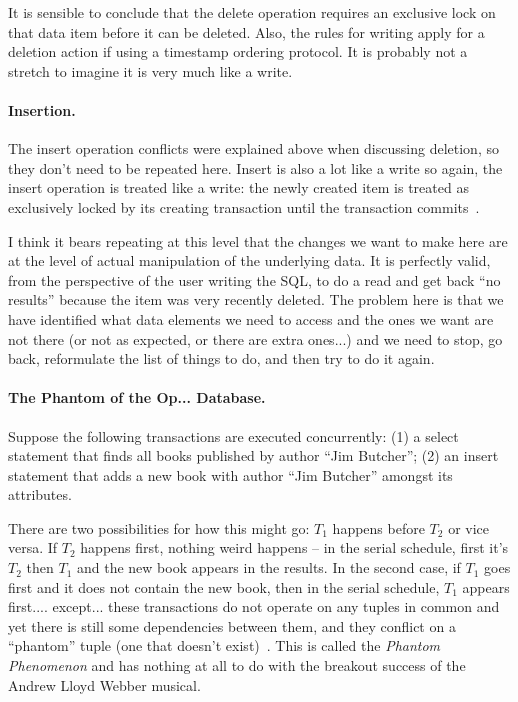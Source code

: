 It is sensible to conclude that the delete operation requires an exclusive lock on that data item before it can be deleted. Also, the rules for writing apply for a deletion action if using a timestamp ordering protocol. It is probably not a stretch to imagine it is very much like a write.

\paragraph{Insertion.} The insert operation conflicts were explained above when discussing deletion, so they don't need to be repeated here. Insert is also a lot like a write so again, the insert operation is treated like a write: the newly created item is treated as exclusively locked by its creating transaction until the transaction commits~\cite{dsc}.

I think it bears repeating at this level that the changes we want to make here are at the level of actual manipulation of the underlying data. It is perfectly valid, from the perspective of the user writing the SQL, to do a read and get back ``no results'' because the item was very recently deleted. The problem here is that we have identified what data elements we need to access and the ones we want are not there (or not as expected, or there are extra ones...) and we need to stop, go back, reformulate the list of things to do, and then try to do it again. 

\paragraph{The Phantom of the Op... Database.} Suppose the following transactions are executed concurrently: (1) a select statement that finds all books published by author ``Jim Butcher''; (2) an insert statement that adds a new book with author ``Jim Butcher'' amongst its attributes. 

There are two possibilities for how this might go: $T_{1}$ happens before $T_{2}$ or vice versa. If $T_{2}$ happens first, nothing weird happens -- in the serial schedule, first it's $T_{2}$ then $T_{1}$ and the new book appears in the results. In the second case, if $T_{1}$ goes first and it does not contain the new book, then in the serial schedule, $T_{1}$ appears first.... except... these transactions do not operate on any tuples in common and yet there is still some dependencies between them, and they conflict on a ``phantom'' tuple (one that doesn't exist)~\cite{dsc}. This is called the \textit{Phantom Phenomenon} and has nothing at all to do with the breakout success of the Andrew Lloyd Webber musical. 

